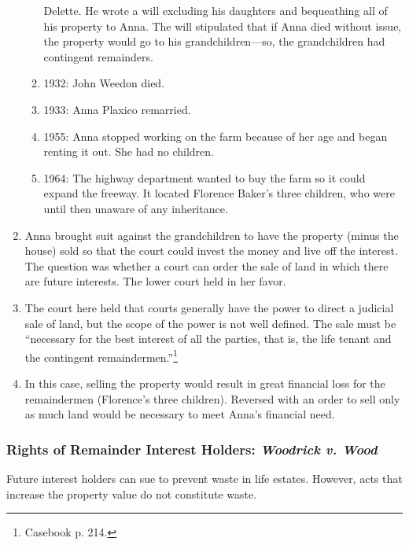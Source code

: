 \begin{enumerate}
\begin{enumerate}
        Delette. He wrote a will excluding his daughters and bequeathing all 
        of his property to Anna. The will stipulated that if Anna died without 
        issue, the property would go to his grandchildren---so, the 
        grandchildren had contingent remainders.
        \item 1932: John Weedon died.
        \item 1933: Anna Plaxico remarried.
        \item 1955: Anna stopped working on the farm because of her age and 
        began renting it out. She had no children.
        \item 1964: The highway department wanted to buy the farm so it could 
        expand the freeway. It located Florence Baker's three children, who 
        were until then unaware of any inheritance.
    \end{enumerate}
    \item Anna brought suit against the grandchildren to have the property 
    (minus the house) sold so that the court could invest the money and live 
    off the interest. The question was whether a court can order the sale of 
    land in which there are future interests. The lower court held in her 
    favor.
    \item The court here held that courts generally have the power to direct a 
    judicial sale of land, but the scope of the power is not well defined. The 
    sale must be ``necessary for the best interest of all the parties, that 
    is, the life tenant and the contingent remaindermen.''\footnote{Casebook 
    p. 214.}
    \item In this case, selling the property would result in great financial 
    loss for the remaindermen (Florence's three children). Reversed with an 
    order to sell only as much land would be necessary to meet Anna's 
    financial need.
\end{enumerate}

\subsubsection{Rights of Remainder Interest Holders: \emph{Woodrick v. Wood}}

Future interest holders can sue to prevent waste in life estates. However, 
acts that increase the property value do not constitute waste.

